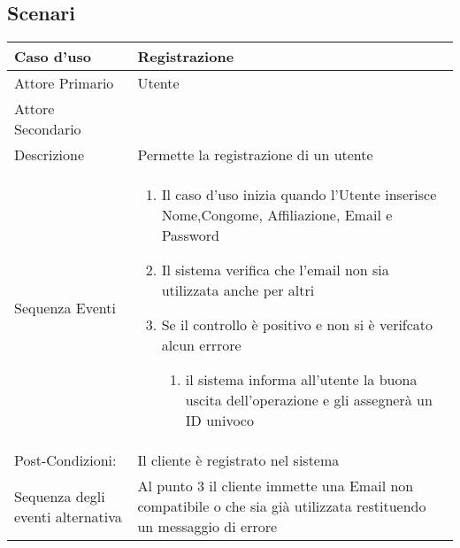 \subsection{Scenari}
\label{sec:scenari}
\begin{tabular}{|p{3cm}|p{7cm}|}
\hline 
\rowcolor{Orchid}
Caso d'uso & Registrazione \\
\hline
Attore Primario & Utente\\
\hline
Attore Secondario & \\
\hline
Descrizione & Permette la registrazione di un utente\\
\hline
  Sequenza Eventi &
                    \begin{enumerate}
                    \item Il caso d'uso inizia quando l'Utente inserisce Nome,Congome, Affiliazione, Email e Password
                    \item Il sistema verifica che l'email non sia utilizzata anche per altri
                    \item Se il controllo è positivo e non si è verifcato alcun errrore
                      \begin{enumerate}
                      \item il sistema informa all'utente la buona uscita dell'operazione e gli assegnerà un ID univoco
                      \end{enumerate}
                    \end{enumerate}\\
\hline
Post-Condizioni: & Il cliente è registrato nel sistema \\
\hline
Sequenza degli eventi alternativa & Al punto 3 il cliente immette una Email non compatibile o che sia già utilizzata restituendo un messaggio di errore\\
\hline
\end{tabular}

